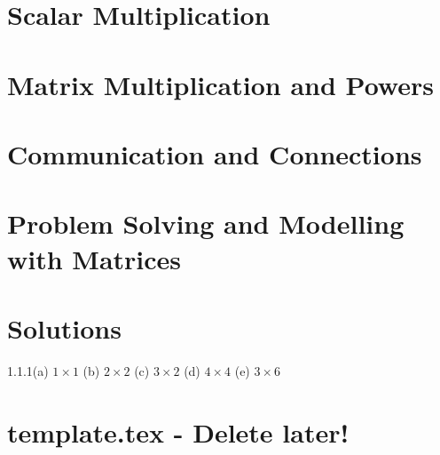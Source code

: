 \documentclass[12pt]{report}
\begin{document}
\chapter{Scalar Multiplication}
\chapter{Matrix Multiplication and Powers}
\chapter{Communication and Connections}
\chapter{Problem Solving and Modelling with Matrices}
\chapter{Solutions}
\begin{multicols}{3}
	1.1.1(a) $1{\times}1$ (b) $2{\times}2$ (c) $3{\times}2$ (d) $4{\times}4$ (e) $3{\times}6$ \\


\end{multicols}





















\pagebreak
\chapter{template.tex - Delete later!}
\end{document}
